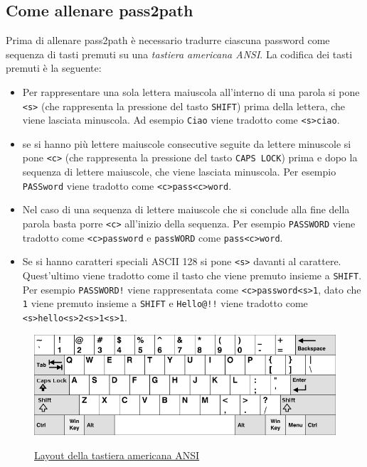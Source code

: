 \subsection{Come allenare pass2path}
Prima di allenare pass2path è necessario tradurre ciascuna password come sequenza di tasti premuti su una \emph{tastiera americana ANSI}. La codifica dei tasti premuti è la seguente:
\begin{itemize}
    \item Per rappresentare una sola lettera maiuscola all'interno di una parola si pone \texttt{<s>} (che rappresenta la pressione del tasto \texttt{SHIFT}) prima della lettera, che viene lasciata minuscola. Ad esempio \texttt{Ciao} viene tradotto come \texttt{<s>ciao}.
    \item se si hanno più lettere maiuscole consecutive seguite da lettere minuscole si pone \texttt{<c>} (che rappresenta la pressione del tasto \texttt{CAPS LOCK}) prima e dopo la sequenza di lettere maiuscole, che viene lasciata minuscola. Per esempio \texttt{PASSword} viene tradotto come \texttt{<c>pass<c>word}.
    \item Nel caso di una sequenza di lettere maiuscole che si conclude alla fine della parola basta porre \texttt{<c>} all'inizio della sequenza. Per esempio \texttt{PASSWORD} viene tradotto come \texttt{<c>password} e \texttt{passWORD} come \texttt{pass<c>word}.
    \item Se si hanno caratteri speciali ASCII 128 si pone \texttt{<s>} davanti al carattere.
    \\
    Quest'ultimo viene tradotto come il tasto che viene premuto insieme a \texttt{SHIFT}.
    Per esempio \texttt{PASSWORD!} viene rappresentata come \texttt{<c>password<s>1}, dato che \texttt{1} viene premuto insieme a \texttt{SHIFT} e \texttt{Hello@!!} viene tradotto come
    \\
    \texttt{<s>hello<s>2<s>1<s>1}.
\end{itemize}

\begin{figure}[h]
    \centering
    \includegraphics[width=15cm]{./immagini/US_keyboard_layout.png}
    \label{US layout}
    \caption{\href{https://upload.wikimedia.org/wikipedia/commons/thumb/5/51/KB_United_States-NoAltGr.svg/800px-KB_United_States-NoAltGr.svg.png}{Layout della tastiera americana ANSI}}
\end{figure}

